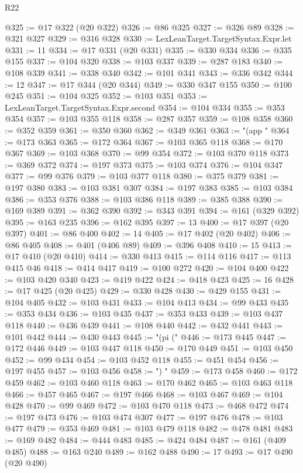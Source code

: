 \begin{lexlean}{R22}
\begin{coremodule}
@325 := @17 @322 (@20 @322)
@326 := @86 @325
@327 := @326 @89
@328 := @321 @327
@329 := @316 @328
@330 := LexLeanTarget.TargetSyntax.Expr.let
@331 := 11
@334 := @17 @331 (@20 @331)
@335 := @330 @334
@336 := @335 @155
@337 := @104 @320
@338 := @103 @337
@339 := @287 @183
@340 := @108 @339
@341 := @338 @340
@342 := @101 @341
@343 := @336 @342
@344 := 12
@347 := @17 @344 (@20 @344)
@349 := @330 @347 @155
@350 := @100 @245
@351 := @104 @325
@352 := @103 @351
@353 := LexLeanTarget.TargetSyntax.Expr.second
@354 := @104 @334
@355 := @353 @354
@357 := @103 @355 @118
@358 := @287 @357
@359 := @108 @358
@360 := @352 @359
@361 := @350 @360
@362 := @349 @361
@363 := "(app "
@364 := @173 @363
@365 := @172 @364
@367 := @103 @365 @118
@368 := @170 @367
@369 := @103 @368
@370 := @99 @354
@372 := @103 @370 @118
@373 := @369 @372
@374 := @197 @373
@375 := @103 @374
@376 := @104 @347
@377 := @99 @376
@379 := @103 @377 @118
@380 := @375 @379
@381 := @197 @380
@383 := @103 @381 @307
@384 := @197 @383
@385 := @103 @384
@386 := @353 @376
@388 := @103 @386 @118
@389 := @385 @388
@390 := @169 @389
@391 := @362 @390
@392 := @343 @391
@394 := @161 (@329 @392)
@395 := @163 @235
@396 := @162 @395
@397 := 13
@400 := @17 @397 (@20 @397)
@401 := @86 @400
@402 := 14
@405 := @17 @402 (@20 @402)
@406 := @86 @405
@408 := @401 (@406 @89)
@409 := @396 @408
@410 := 15
@413 := @17 @410 (@20 @410)
@414 := @330 @413
@415 := @114 @116
@417 := @113 @415 @46
@418 := @414 @417
@419 := @100 @272
@420 := @104 @400
@422 := @103 @420 @340
@423 := @419 @422
@424 := @418 @423
@425 := 16
@428 := @17 @425 (@20 @425)
@429 := @330 @428
@430 := @429 @155
@431 := @104 @405
@432 := @103 @431
@433 := @104 @413
@434 := @99 @433
@435 := @353 @434
@436 := @103 @435
@437 := @353 @433
@439 := @103 @437 @118
@440 := @436 @439
@441 := @108 @440
@442 := @432 @441
@443 := @101 @442
@444 := @430 @443
@445 := "(pi ("
@446 := @173 @445
@447 := @172 @446
@449 := @103 @447 @118
@450 := @170 @449
@451 := @103 @450
@452 := @99 @434
@454 := @103 @452 @118
@455 := @451 @454
@456 := @197 @455
@457 := @103 @456
@458 := ") "
@459 := @173 @458
@460 := @172 @459
@462 := @103 @460 @118
@463 := @170 @462
@465 := @103 @463 @118
@466 := @457 @465
@467 := @197 @466
@468 := @103 @467
@469 := @104 @428
@470 := @99 @469
@472 := @103 @470 @118
@473 := @468 @472
@474 := @197 @473
@476 := @103 @474 @307
@477 := @197 @476
@478 := @103 @477
@479 := @353 @469
@481 := @103 @479 @118
@482 := @478 @481
@483 := @169 @482
@484 := @444 @483
@485 := @424 @484
@487 := @161 (@409 @485)
@488 := @163 @240
@489 := @162 @488
@490 := 17
@493 := @17 @490 (@20 @490)

\end{coremodule}
\end{lexlean}
